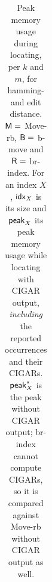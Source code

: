 \begin{table}[t!]
\begin{tabular}{|rr|rrr|rr|rrr|rr|rrr||rr|r|rr|r|r|}
\hline
\end{tabular}
\caption{
Peak memory usage during locating, per $k$ and $m$, for hamming- and edit distance.
$\mathsf{M}=$ Move-rb, $\mathsf{B}=$ b-move and $\mathsf{R}=$ br-index.
For an index $X$, $\mathsf{idx}_{X}$ is its size and $\mathsf{peak}_{X}$ its peak memory usage while locating with CIGAR output, \emph{including} the reported occurrences and their CIGARs.
$\mathsf{peak}_{X}^{*}$ is the peak without CIGAR output; br-index cannot compute CIGARs, so it is compared against Move-rb without CIGAR output as well.
}
\label{tab:mem}
\end{table}
